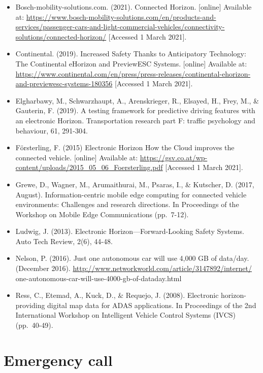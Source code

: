 \documentclass[
]{book}
\providecommand{\tightlist}{%
  \setlength{\itemsep}{0pt}\setlength{\parskip}{0pt}}
\begin{document}
\begin{itemize}
\tightlist
\item
  Bosch-mobility-solutions.com. (2021). Connected Horizon. {[}online{]} Available at: \url{https://www.bosch-mobility-solutions.com/en/products-and-services/passenger-cars-and-light-commercial-vehicles/connectivity-solutions/connected-horizon/} {[}Accessed 1 March 2021{]}.
\item
  Continental. (2019). Increased Safety Thanks to Anticipatory Technology: The Continental eHorizon and PreviewESC Systems. {[}online{]} Available at: \url{https://www.continental.com/en/press/press-releases/continental-ehorizon-and-previewesc-systems-180356} {[}Accessed 1 March 2021{]}.
\item
  Elgharbawy, M., Schwarzhaupt, A., Arenskrieger, R., Elsayed, H., Frey, M., \& Gauterin, F. (2019). A testing framework for predictive driving features with an electronic Horizon. Transportation research part F: traffic psychology and behaviour, 61, 291-304.
\item
  Försterling, F. (2015) Electronic Horizon How the Cloud improves the connected vehicle. {[}online{]} Available at: \url{https://gsv.co.at/wp-content/uploads/2015_05_06_Foersterling.pdf} {[}Accessed 1 March 2021{]}.
\item
  Grewe, D., Wagner, M., Arumaithurai, M., Psaras, I., \& Kutscher, D. (2017, August). Information-centric mobile edge computing for connected vehicle environments: Challenges and research directions. In Proceedings of the Workshop on Mobile Edge Communications (pp.~7-12).
\item
  Ludwig, J. (2013). Electronic Horizon---Forward-Looking Safety Systems. Auto Tech Review, 2(6), 44-48.
\item
  Nelson, P. (2016). Just one autonomous car will use 4,000 GB of data/day. (December 2016). \url{http://www.networkworld.com/article/3147892/internet/} one-autonomous-car-will-use-4000-gb-of-dataday.html
\item
  Ress, C., Etemad, A., Kuck, D., \& Requejo, J. (2008). Electronic horizon-providing digital map data for ADAS applications. In Proceedings of the 2nd International Workshop on Intelligent Vehicle Control Systems (IVCS) (pp.~40-49).
\end{itemize}

\hypertarget{emergency-call}{%
\section{Emergency call}\label{emergency-call}}
\end{document}
